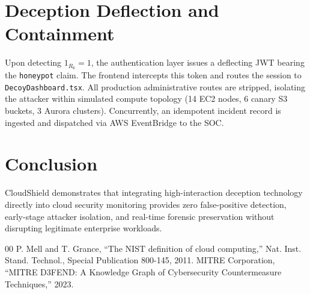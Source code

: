 \documentclass[conference]{IEEEtran}
\begin{document}
\section{Deception Deflection and Containment}
Upon detecting $1_{R_6} = 1$, the authentication layer issues a deflecting JWT bearing the \texttt{honeypot} claim. The frontend intercepts this token and routes the session to \texttt{DecoyDashboard.tsx}. All production administrative routes are stripped, isolating the attacker within simulated compute topology (14 EC2 nodes, 6 canary S3 buckets, 3 Aurora clusters). Concurrently, an idempotent incident record is ingested and dispatched via AWS EventBridge to the SOC.

\section{Conclusion}
CloudShield demonstrates that integrating high-interaction deception technology directly into cloud security monitoring provides zero false-positive detection, early-stage attacker isolation, and real-time forensic preservation without disrupting legitimate enterprise workloads.


\begin{thebibliography}{00}
 P. Mell and T. Grance, ``The NIST definition of cloud computing,'' Nat. Inst. Stand. Technol., Special Publication 800-145, 2011.
 MITRE Corporation, ``MITRE D3FEND: A Knowledge Graph of Cybersecurity Countermeasure Techniques,'' 2023.
\end{thebibliography}
\end{document}
